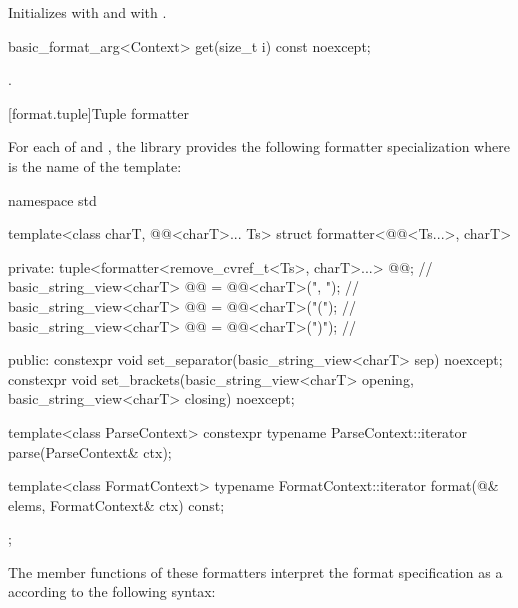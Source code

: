 \begin{itemdescr}
\pnum
\effects
Initializes
 with  and
 with .
\end{itemdescr}

%
\begin{itemdecl}
basic_format_arg<Context> get(size_t i) const noexcept;
\end{itemdecl}

\begin{itemdescr}
\pnum
\returns
{}.
\end{itemdescr}

[format.tuple]{Tuple formatter}

\pnum
For each of  and ,
the library provides the following formatter specialization
where  is the name of the template:

%
\begin{codeblock}
namespace std {
  template<class charT, @@<charT>... Ts>
  struct formatter<@@<Ts...>, charT> {
  private:
    tuple<formatter<remove_cvref_t<Ts>, charT>...> @@;               // \expos
    basic_string_view<charT> @@ = @@<charT>(", ");      // \expos
    basic_string_view<charT> @@ = @@<charT>("("); // \expos
    basic_string_view<charT> @@ = @@<charT>(")"); // \expos

  public:
    constexpr void set_separator(basic_string_view<charT> sep) noexcept;
    constexpr void set_brackets(basic_string_view<charT> opening,
                                basic_string_view<charT> closing) noexcept;

    template<class ParseContext>
      constexpr typename ParseContext::iterator
        parse(ParseContext& ctx);

    template<class FormatContext>
      typename FormatContext::iterator
        format(@\seebelow@& elems, FormatContext& ctx) const;
  };
}
\end{codeblock}

\pnum
The  member functions of these formatters
interpret the format specification as
a  according to the following syntax:

